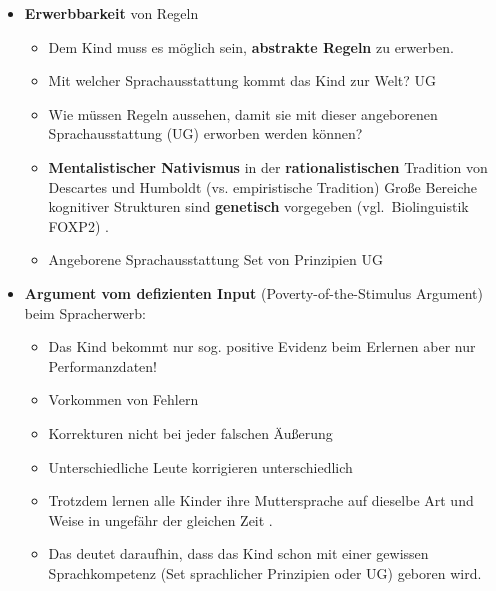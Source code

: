\begin{frame}

\begin{itemize}
	\item \textbf{Erwerbbarkeit} von Regeln 
	\begin{itemize}
		\item Dem Kind muss es möglich sein, \textbf{abstrakte Regeln} zu erwerben.
		\medskip
		\item Mit welcher Sprachausstattung kommt das Kind zur Welt? \ras UG
		\medskip
		\item Wie müssen Regeln aussehen, damit sie mit dieser angeborenen Sprachausstattung (UG) erworben werden können?
		\medskip
		\item \textbf{Mentalistischer Nativismus} in der \textbf{rationalistischen} Tradition von Descartes und Humboldt (vs. empiristische Tradition) \ras Große Bereiche kognitiver Strukturen sind \textbf{genetisch} vorgegeben (vgl.\ Biolinguistik \ras FOXP2) \citep[vgl.][]{Hornstein05a}.
		\medskip
		\item Angeborene Sprachausstattung \ras Set von Prinzipien \ras UG		
	\end{itemize}
\end{itemize}

\end{frame}


\begin{frame}

\begin{itemize}
	\item \textbf{Argument vom defizienten Input} (Poverty-of-the-Stimulus Argument) beim Spracherwerb:
	
	\begin{itemize}
		\item Das Kind bekommt nur sog. positive Evidenz beim Erlernen \ras aber nur Performanzdaten!
		\medskip
		\item Vorkommen von Fehlern
		\medskip
		\item Korrekturen \ras nicht bei jeder falschen Äußerung
		\medskip
		\item Unterschiedliche Leute korrigieren unterschiedlich
		\medskip
		\item Trotzdem lernen alle Kinder ihre Muttersprache auf dieselbe Art und Weise in ungefähr der gleichen Zeit \citep[vgl.][18ff.]{Philippi&Tewes10a}.
		\medskip
		\item Das deutet daraufhin, dass das Kind schon mit einer gewissen Sprachkompetenz (Set sprachlicher Prinzipien oder UG) geboren wird.

	\end{itemize}

\end{itemize}

\end{frame}


